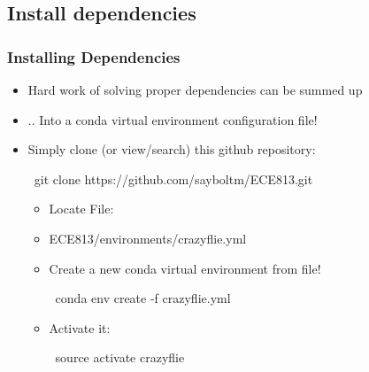 \documentclass[t, xcolor=dvipsnames]{beamer}
\begin{document}
\subsection{Install dependencies}
\begin{frame}
	\frametitle{Installing Dependencies}
	\begin{itemize}	
		\item Hard work of solving proper dependencies can be summed up
		\item .. Into a conda virtual environment configuration file!
		\item Simply clone (or view/search) this github repository:
			\begin{semiverbatim}
			\ git clone https://github.com/sayboltm/ECE813.git
			\end{semiverbatim} 
		\begin{itemize}
			\item Locate File:
			\item ECE813/environments/crazyflie.yml	
			\item Create a new conda virtual environment from file!
				\begin{semiverbatim}
				\ conda env create -f crazyflie.yml
				\end{semiverbatim}
			\item Activate it:	
				\begin{semiverbatim}
				\ source activate crazyflie
				\end{semiverbatim}
		\end{itemize}
	\end{itemize}
\end{frame}
\end{document}
